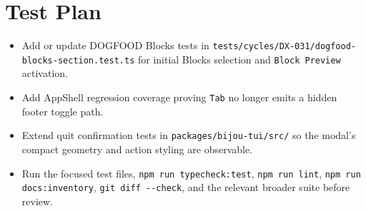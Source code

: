 \section{Test Plan}\label{record-115-test-plan}

\begin{itemize}
\tightlist
\item
  Add or update DOGFOOD Blocks tests in \texttt{t\allowbreak{}e\allowbreak{}s\allowbreak{}t\allowbreak{}s\allowbreak{}/\allowbreak{}c\allowbreak{}y\allowbreak{}c\allowbreak{}l\allowbreak{}e\allowbreak{}s\allowbreak{}/\allowbreak{}D\allowbreak{}X\allowbreak{}-\allowbreak{}0\allowbreak{}3\allowbreak{}1\allowbreak{}/\allowbreak{}d\allowbreak{}o\allowbreak{}g\allowbreak{}f\allowbreak{}o\allowbreak{}o\allowbreak{}d\allowbreak{}-\allowbreak{}b\allowbreak{}l\allowbreak{}o\allowbreak{}c\allowbreak{}k\allowbreak{}s\allowbreak{}-\allowbreak{}s\allowbreak{}e\allowbreak{}c\allowbreak{}t\allowbreak{}i\allowbreak{}o\allowbreak{}n\allowbreak{}.\allowbreak{}t\allowbreak{}e\allowbreak{}s\allowbreak{}t\allowbreak{}.\allowbreak{}t\allowbreak{}s} for initial Blocks selection and \texttt{B\allowbreak{}l\allowbreak{}o\allowbreak{}c\allowbreak{}k\allowbreak{} \allowbreak{}P\allowbreak{}r\allowbreak{}e\allowbreak{}v\allowbreak{}i\allowbreak{}e\allowbreak{}w} activation.
\item
  Add AppShell regression coverage proving \texttt{T\allowbreak{}a\allowbreak{}b} no longer emits a hidden footer toggle path.
\item
  Extend quit confirmation tests in \texttt{p\allowbreak{}a\allowbreak{}c\allowbreak{}k\allowbreak{}a\allowbreak{}g\allowbreak{}e\allowbreak{}s\allowbreak{}/\allowbreak{}b\allowbreak{}i\allowbreak{}j\allowbreak{}o\allowbreak{}u\allowbreak{}-\allowbreak{}t\allowbreak{}u\allowbreak{}i\allowbreak{}/\allowbreak{}s\allowbreak{}r\allowbreak{}c\allowbreak{}/} so the modal's compact geometry and action styling are observable.
\item
  Run the focused test files, \texttt{n\allowbreak{}p\allowbreak{}m\allowbreak{} \allowbreak{}r\allowbreak{}u\allowbreak{}n\allowbreak{} \allowbreak{}t\allowbreak{}y\allowbreak{}p\allowbreak{}e\allowbreak{}c\allowbreak{}h\allowbreak{}e\allowbreak{}c\allowbreak{}k\allowbreak{}:\allowbreak{}t\allowbreak{}e\allowbreak{}s\allowbreak{}t}, \texttt{n\allowbreak{}p\allowbreak{}m\allowbreak{} \allowbreak{}r\allowbreak{}u\allowbreak{}n\allowbreak{} \allowbreak{}l\allowbreak{}i\allowbreak{}n\allowbreak{}t}, \texttt{n\allowbreak{}p\allowbreak{}m\allowbreak{} \allowbreak{}r\allowbreak{}u\allowbreak{}n\allowbreak{} \allowbreak{}d\allowbreak{}o\allowbreak{}c\allowbreak{}s\allowbreak{}:\allowbreak{}i\allowbreak{}n\allowbreak{}v\allowbreak{}e\allowbreak{}n\allowbreak{}t\allowbreak{}o\allowbreak{}r\allowbreak{}y}, \texttt{g\allowbreak{}i\allowbreak{}t\allowbreak{} \allowbreak{}d\allowbreak{}i\allowbreak{}f\allowbreak{}f\allowbreak{} \allowbreak{}-\allowbreak{}-\allowbreak{}c\allowbreak{}h\allowbreak{}e\allowbreak{}c\allowbreak{}k}, and the relevant broader suite before review.
\end{itemize}

